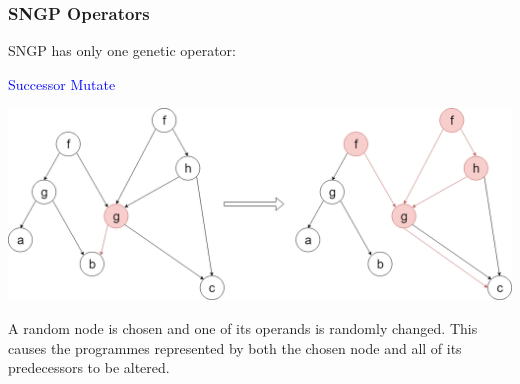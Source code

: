 \documentclass{beamer}
\newcommand{\blue}[1]{\textcolor{blue}{#1}}
\begin{document}
		\begin{frame}
			\frametitle{SNGP Operators}
			
			SNGP has only one genetic operator:
			
			\begin{center}
				
				\blue{Successor Mutate}
				
				\includegraphics[scale=0.2]{resources/10_successor_mutate}
				
				A random node is chosen and one of its operands is randomly changed. This causes the programmes represented by both the chosen node and all of its predecessors to be altered.
				
			\end{center}
			
		\end{frame}
	
\end{document}
